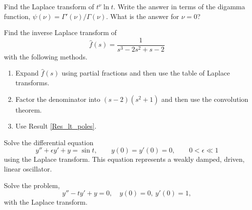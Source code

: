 {\begin{Exercise}
\end{Exercise}






\begin{Exercise}
  \label{exercise L(t nu ln t)}
  Find the Laplace transform of $t^\nu \ln t$.  Write the answer in terms 
  of the digamma function, $\psi(\nu) = \Gamma'(\nu)/\Gamma(\nu)$.
  What is the answer for $\nu = 0$?

\end{Exercise}







\begin{Exercise}
  \label{exercise L(1/(s3-2s2+s-2))}
  Find the inverse Laplace transform of
  \[ 
  \hat{f}(s) = \frac{1}{s^3 - 2s^2 + s - 2} 
  \]
  with the following methods.
  \begin{enumerate}
  \item Expand $\hat{f}(s)$ using partial fractions and then use the table of 
    Laplace transforms.
  \item  Factor the denominator into $(s-2)(s^2+1)$ and then use the 
    convolution theorem.
  \item Use Result \ref{Res_lt_poles}.
  \end{enumerate}

\end{Exercise}






\begin{Exercise}
  \label{exercise y''+ey'+y=sin t}
  Solve the differential equation
  \[ 
  y'' + \epsilon y' + y = \sin t, \qquad y(0) = y'(0) = 0, \qquad 0 < \epsilon \ll 1 
  \]
  using the Laplace transform.
  This equation represents a weakly damped, driven, linear oscillator.

\end{Exercise}





\begin{Exercise}
  \label{exercise y''-ty'+y=0}
  Solve the problem,
  \[
  y'' - t y' + y = 0, \quad y(0) = 0,\ y'(0) = 1,
  \]
  with the Laplace transform.


\end{Exercise}}
